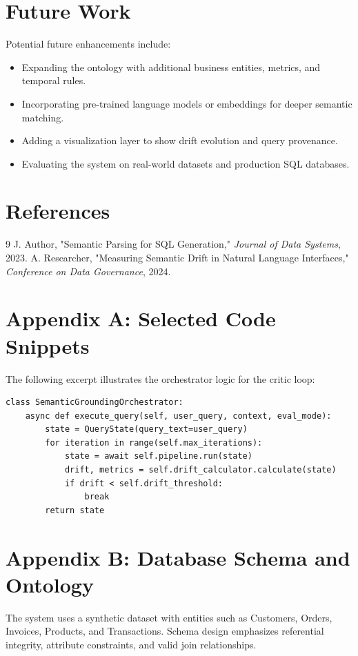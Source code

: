 \documentclass[12pt,a4paper]{article}
\begin{document}
\section{Future Work}
Potential future enhancements include:
\begin{itemize}[leftmargin=*]
  \item Expanding the ontology with additional business entities, metrics, and temporal rules.
  \item Incorporating pre-trained language models or embeddings for deeper semantic matching.
  \item Adding a visualization layer to show drift evolution and query provenance.
  \item Evaluating the system on real-world datasets and production SQL databases.
\end{itemize}

\section{References}
\begin{thebibliography}{9}
 J. Author, "Semantic Parsing for SQL Generation," \textit{Journal of Data Systems}, 2023.
 A. Researcher, "Measuring Semantic Drift in Natural Language Interfaces," \textit{Conference on Data Governance}, 2024.
\end{thebibliography}

\appendix
\section{Appendix A: Selected Code Snippets}
The following excerpt illustrates the orchestrator logic for the critic loop:
\begin{verbatim}
class SemanticGroundingOrchestrator:
    async def execute_query(self, user_query, context, eval_mode):
        state = QueryState(query_text=user_query)
        for iteration in range(self.max_iterations):
            state = await self.pipeline.run(state)
            drift, metrics = self.drift_calculator.calculate(state)
            if drift < self.drift_threshold:
                break
        return state
\end{verbatim}

\section{Appendix B: Database Schema and Ontology}
The system uses a synthetic dataset with entities such as Customers, Orders, Invoices, Products, and Transactions. Schema design emphasizes referential integrity, attribute constraints, and valid join relationships.
\end{document}
